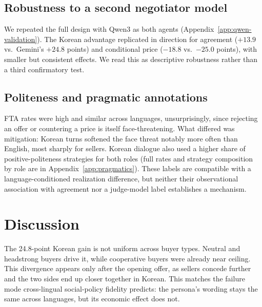\documentclass{article}
\begin{document}
\subsection{Robustness to a second negotiator model}
We repeated the full design with Qwen3 as both agents
(Appendix~\ref{app:qwen-validation}). The Korean advantage replicated in
direction for agreement ($+13.9$ vs.\ Gemini's $+24.8$ points) and conditional
price ($-18.8$ vs.\ $-25.0$ points), with smaller but consistent effects.
We read this as descriptive robustness rather than a third confirmatory test.

\subsection{Politeness and pragmatic annotations}
FTA rates were high and similar across languages, unsurprisingly, since
rejecting an offer or countering a price is itself face-threatening. What
differed was mitigation: Korean turns softened the face threat notably more
often than English, most sharply for sellers. Korean dialogue also used a
higher share of positive-politeness strategies for both roles (full rates
and strategy composition by role are in Appendix~\ref{app:pragmatics}).
These labels are compatible with a language-conditioned realization
difference, but neither their observational association with agreement nor
a judge-model label establishes a mechanism.


\section{Discussion}
\label{sec:discussion}

The 24.8-point Korean gain is not uniform across buyer types. Neutral and headstrong buyers drive it, while cooperative buyers were already near ceiling. This divergence appears only after the opening offer, as sellers concede further and the two sides end up closer together in Korean. This matches the failure
mode cross-lingual social-policy fidelity predicts: the persona's wording
stays the same across languages, but its economic effect does not.
\end{document}
